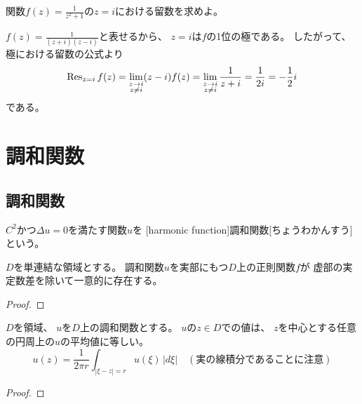 \documentclass[report]{jlreq}
\begin{document}
\begin{problem}[ChatGPT]
    関数$f(z) = \frac{1}{z^2 + 1}$の$z = i$における留数を求めよ。
\end{problem}

\begin{answer}
    $f(z) = \frac{1}{(z + i)(z - i)}$と表せるから、
    $z = i$は$f$の1位の極である。
    したがって、極における留数の公式より
    \begin{equation}
        \operatorname{Res}_{z = i} f(z)
            = \lim_{\substack{z \to i \\ z \neq i}}
                (z - i) f(z)
            = \lim_{\substack{z \to i \\ z \neq i}}
                \frac{1}{z + i}
            = \frac{1}{2i}
            = - \frac{1}{2} i
    \end{equation}
    である。
\end{answer}



%
\chapter{調和関数}

%
\section{調和関数}

\begin{definition}[調和関数]
    $C^2$かつ$\Delta u = 0$を満たす関数$u$を
    [harmonic function]{調和関数}[ちょうわかんすう]という。
\end{definition}

\begin{propdef}[随伴調和関数]
    $D$を単連結な領域とする。
    調和関数$u$を実部にもつ$D$上の正則関数$f$が
    虚部の実定数差を除いて一意的に存在する。
\end{propdef}

\begin{proof}
    \TODO{}
\end{proof}

\begin{theorem}[平均値性質]
    $D$を領域、
    $u$を$D$上の調和関数とする。
    $u$の$z \in D$での値は、
    $z$を中心とする任意の円周上の$u$の平均値に等しい。
    \begin{equation}
        u(z)
            =
                \frac{1}{2\pi r}
                \int_{|\xi - z| = r}
                    u(\xi)
                    \, |d\xi|
                \quad
                (\text{実の線積分であることに注意})
    \end{equation}
\end{theorem}

\begin{proof}
    \TODO{}
\end{proof}
\end{document}
